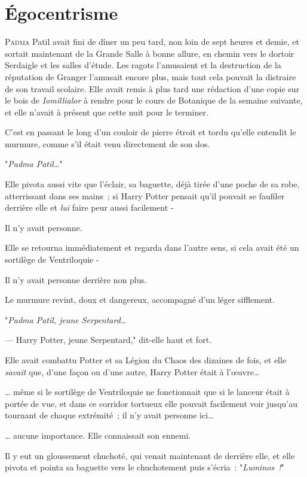 \chapter{Égocentrisme}

\lettrine{P}{adma} Patil avait fini de dîner un peu tard, non loin de sept heures et demie, et sortait maintenant de la Grande Salle à bonne allure, en chemin vers le dortoir Serdaigle et les salles d'étude. Les ragots l'amusaient et la destruction de la réputation de Granger l'amusait encore plus, mais tout cela pouvait la distraire de son travail scolaire. Elle avait remis à plus tard une rédaction d'une copie sur le bois de \emph{Iomillialor} à rendre pour le cours de Botanique de la semaine suivante, et elle n'avait à présent que cette nuit pour le terminer.

C'est en passant le long d'un couloir de pierre étroit et tordu qu'elle entendit le murmure, comme s'il était venu directement de son dos.

"\emph{Padma Patil…}"

Elle pivota aussi vite que l'éclair, sa baguette, déjà tirée d'une poche de sa robe, atterrissant dans ses mains~; si Harry Potter pensait qu'il pouvait se faufiler derrière elle et \emph{lui} faire peur aussi facilement -

Il n'y avait personne.

Elle se retourna immédiatement et regarda dans l'autre sens, si cela avait été un sortilège de Ventriloquie -

Il n'y avait personne derrière non plus.

Le murmure revint, doux et dangereux, accompagné d'un léger sifflement.

"\emph{Padma Patil, jeune Serpentard…}

--- Harry Potter, jeune Serpentard," dit-elle haut et fort.

Elle avait combattu Potter et sa Légion du Chaos des dizaines de fois, et elle \emph{savait} que, d'une façon ou d'une autre, Harry Potter était à l'œuvre…

… même si le sortilège de Ventriloquie ne fonctionnait que si le lanceur était à portée de vue, et dans ce corridor tortueux elle pouvait facilement voir jusqu'au tournant de chaque extrémité~; il n'y avait personne ici…

… aucune importance. Elle connaissait son ennemi.

Il y eut un gloussement chuchoté, qui venait maintenant de derrière elle, et elle pivota et pointa sa baguette vers le chuchotement puis s'écria~: "\emph{Luminos~!}"

